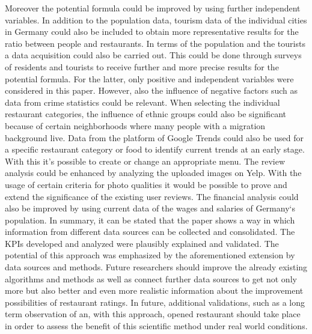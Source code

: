 Moreover the potential formula could be improved by using further independent variables. In addition to the population data, tourism data of the individual cities in Germany could also be included to obtain more representative results for the ratio between people and restaurants. In terms of the population and the tourists a data acquisition could also be carried out. This could be done through surveys of residents and tourists to receive further and more precise results for the potential formula. For the latter, only positive and independent variables were considered in this paper. However, also the influence of negative factors such as data from crime statistics could be relevant. \newline
When selecting the individual restaurant categories, the influence of ethnic groups could also be significant because of certain neighborhoods where many people with a migration background live. Data from the platform of Google Trends could also be used for a specific restaurant category or food to identify current trends at an early stage. With this it's possible to create or change an appropriate menu. \newline
The review analysis could be enhanced by analyzing the uploaded images on Yelp. With the usage of certain criteria for photo qualities it would be possible to prove and extend the significance of the existing user reviews. The financial analysis could also be improved by using current data of the wages and salaries of Germany‘s population.\newline
In summary, it can be stated that the paper shows a way in which information from different data sources can be collected and consolidated.\newline
The \acp{KPI} developed and analyzed were plausibly explained and validated. The potential of this approach was emphasized by the aforementioned extension by data sources and methods. Future researchers should improve the already existing algorithms and methods as well as connect further data sources to get not only more but also better and even more realistic information about the improvement possibilities of restaurant ratings.
In future, additional validations, such as a long term observation of an, with this approach, opened restaurant should take place in order to assess the benefit of this scientific method under real world conditions. 
